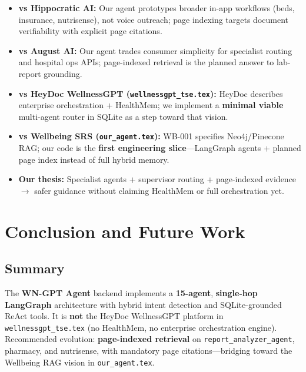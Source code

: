 \documentclass[12pt,a4paper]{article}
\begin{document}
\begin{itemize}[leftmargin=*]
    \item \textbf{vs Hippocratic AI:} Our agent prototypes broader in-app workflows (beds, insurance, nutrisense), not voice outreach; page indexing targets document verifiability with explicit page citations.
    \item \textbf{vs August AI:} Our agent trades consumer simplicity for specialist routing and hospital ops APIs; page-indexed retrieval is the planned answer to lab-report grounding.
    \item \textbf{vs HeyDoc WellnessGPT (\texttt{wellnessgpt\_tse.tex}):} HeyDoc describes enterprise orchestration + HealthMem; we implement a \textbf{minimal viable} multi-agent router in SQLite as a step toward that vision.
    \item \textbf{vs Wellbeing SRS (\texttt{our\_agent.tex}):} WB-001 specifies Neo4j/Pinecone RAG; our code is the \textbf{first engineering slice}---LangGraph agents + planned page index instead of full hybrid memory.
    \item \textbf{Our thesis:} Specialist agents + supervisor routing + page-indexed evidence $\rightarrow$ safer guidance without claiming HealthMem or full orchestration yet.
\end{itemize}

\newpage

\section{Conclusion and Future Work}

\subsection{Summary}

The \textbf{WN-GPT Agent} backend implements a \textbf{15-agent}, \textbf{single-hop LangGraph} architecture with hybrid intent detection and SQLite-grounded ReAct tools. It is \textbf{not} the HeyDoc WellnessGPT platform in \texttt{wellnessgpt\_tse.tex} (no HealthMem, no enterprise orchestration engine). Recommended evolution: \textbf{page-indexed retrieval} on \texttt{report\_analyzer\_agent}, pharmacy, and nutrisense, with mandatory page citations---bridging toward the Wellbeing RAG vision in \texttt{our\_agent.tex}.
\end{document}
